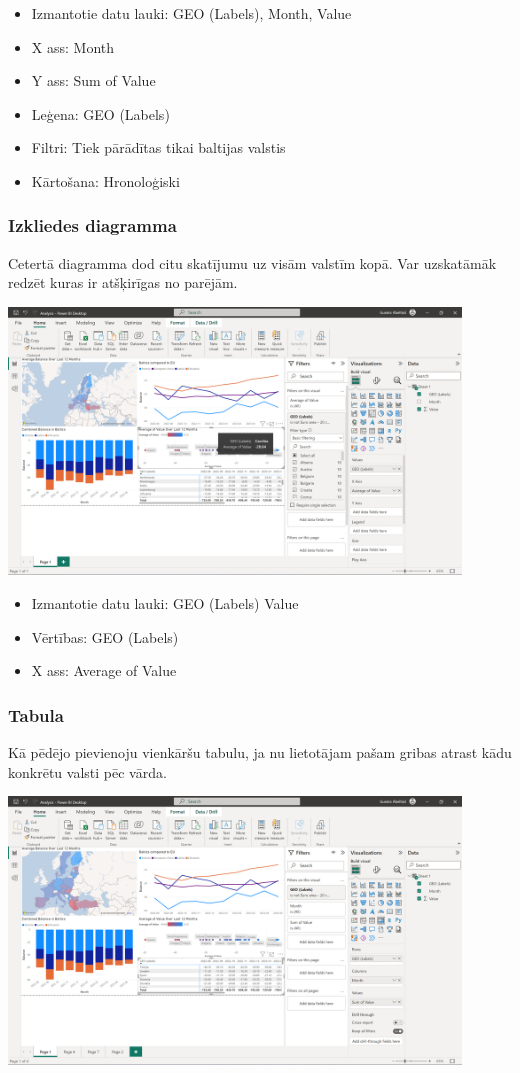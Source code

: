 \documentclass{article}
\begin{document}
\begin{itemize}
\item Izmantotie datu lauki: GEO (Labels), Month, Value
\item X ass: Month
\item Y ass: Sum of Value
\item Leģena: GEO (Labels)
\item Filtri: Tiek pārādītas tikai baltijas valstis
\item Kārtošana: Hronoloģiski
\end{itemize}


\subsubsection{Izkliedes diagramma}
Cetertā diagramma dod citu skatījumu uz visām valstīm kopā. Var uzskatāmāk redzēt kuras ir atšķirīgas no parējām.

\includegraphics[width=0.9\textwidth, center]{Scatter}

\begin{itemize}
\item Izmantotie datu lauki: GEO (Labels) Value
\item Vērtības: GEO (Labels)
\item X ass: Average of Value
\end{itemize}

\subsubsection{Tabula}
Kā pēdējo pievienoju vienkāršu tabulu, ja nu lietotājam pašam gribas atrast kādu konkrētu valsti pēc vārda.

\includegraphics[width=0.9\textwidth, center]{Matrix}
\end{document}
